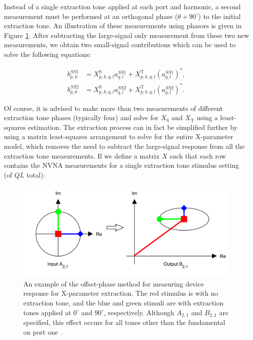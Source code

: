 \documentclass[../thesis/thesis.tex]{subfiles}
\begin{document}
\begin{refsection}
Instead of a single extraction tone applied at each port and harmonic, a second measurement must be performed at an orthogonal phase ($\theta+90^{\circ}$) to the initial extraction tone. An illustration of these measurements using phasors is given in Figure \ref{ch5_fig_extract}. After subtracting the large-signal only measurement from these two new measurements, we obtain two small-signal contributions which can be used to solve the following equations:

\begin{align}
	b^{SS1}_{p,k} &= X^\textrm{S}_{p,k,q,l}a^{SS1}_{q,l} + X^\textrm{T}_{p,k,q,l}(a^{SS1}_{q,l})^*, \\
	b^{SS2}_{p,k} &= X^\textrm{S}_{p,k,q,l}a^{SS2}_{q,l} + X^\textrm{T}_{p,k,q,l}(a^{SS2}_{q,l})^*.
\end{align}

Of course, it is advised to make more than two measurements of different extraction tone phases (typically four) and solve for $X_\textrm{S}$ and $X_\textrm{T}$ using a least-squares estimation. The extraction process can in fact be simplified further by using a matrix least-squares arrangement to solve for the entire X-parameter model, which removes the need to subtract the large-signal response from all the extraction tone measurements. If we define a matrix $X$ such that each row contains the NVNA measurements for a single extraction tone stimulus setting (of $QL$ total):

\begin{figure}
	\centering
	\includegraphics[width=\textwidth]{extract}
	\caption[Offset-phase X-parameter extraction procedure.]{An example of the offset-phase method for measuring device response for X-parameter extraction. The red stimulus is with no extraction tone, and the blue and green stimuli are with extraction tones applied at $0^{\circ}$ and $90^{\circ}$, respectively. Although $A_{2,1}$ and $B_{2,1}$ are specified, this effect occurs for all tones other than the fundamental on port one \cite{Verspecht_2006}.}
	\label{ch5_fig_extract}
\end{figure}


\end{refsection}
\end{document}
